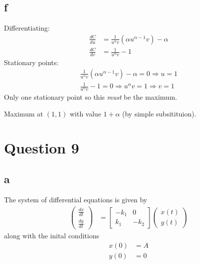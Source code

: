 \documentclass{unswmaths}
\begin{document}
\subsection*{f}
    Differentiating:
    \begin{align*}
        \frac{dC}{du} &= \frac{1}{u^\alpha v} ( \alpha u^{\alpha-1} v ) - \alpha \\
        \frac{dC}{dv} &= \frac{1}{u^\alpha v} - 1
    \end{align*}
    Stationary points:
    \begin{align*}
        \frac{1}{u^\alpha v} ( \alpha u^{\alpha-1} v ) - \alpha = 0 \Longrightarrow u = 1 \\
        \frac{1}{u^\alpha v} - 1 = 0 \Longrightarrow u^\alpha v = 1 \Longrightarrow v = 1
    \end{align*}
    Only one stationary point so this \emph{must} be the maximum. 
    
    Maximum at $ (1,1) $ with value $ 1 + \alpha $ (by simple subsitituion).
\section*{Question 9}
\subsection*{a}
\begin{figure}[H]
\end{figure}

The system of differential equations is given by
\begin{align*}
    \left( \begin{array}{c} \frac{dx}{dt} \\ \frac{dy}{dt} \end{array}\right) &= \left[ \begin{array}{cc} -k_1 & 0 \\ k_1 & -k_2 \end{array} \right] \left( \begin{array}{c} x(t) \\ y(t) \end{array}\right)
\end{align*}
along with the inital conditions
\begin{align*}
    x(0) &= A \\
    y(0) &= 0 
\end{align*}
\end{document}
